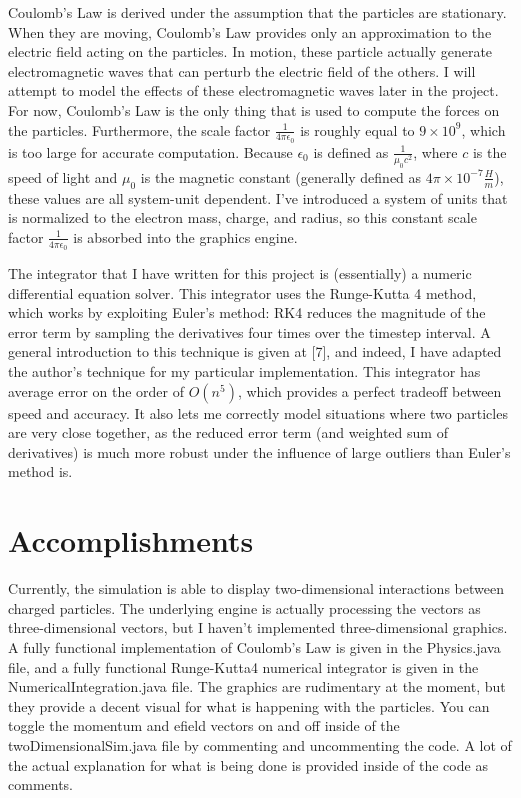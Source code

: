 \documentclass[10pt]{article}
\begin{document}
Coulomb's Law is derived under the assumption that the particles are stationary. When they are moving, Coulomb's Law provides only an approximation to the electric field acting on the particles. In motion, these particle actually generate electromagnetic waves that can perturb the electric field of the others. I will attempt to model the effects of these electromagnetic waves later in the project. For now, Coulomb's Law is the only thing that is used to compute the forces on the particles. Furthermore, the scale factor $\frac{1}{4\pi\epsilon_0}$ is roughly equal to $9 \times 10^9$, which is too large for accurate computation. Because $\epsilon_0$ is defined as $\frac{1}{\mu_0 c^2}$, where $c$ is the speed of light and $\mu_0$ is the magnetic constant (generally defined as $4\pi \times 10^{-7} \frac{H}{m}$), these values are all system-unit dependent. I've introduced a system of units that is normalized to the electron mass, charge, and radius, so this constant scale factor $\frac{1}{4\pi\epsilon_0}$ is absorbed into the graphics engine.

The integrator that I have written for this project is (essentially) a numeric differential equation solver. This integrator uses the Runge-Kutta 4 method, which works by exploiting Euler's method: RK4 reduces the magnitude of the error term by sampling the derivatives four times over the timestep interval. A general introduction to this technique is given at [7], and indeed, I have adapted the author's technique for my particular implementation. This integrator has average error on the order of $O(n^5)$, which provides a perfect tradeoff between speed and accuracy. It also lets me correctly model situations where two particles are very close together, as the reduced error term (and weighted sum of derivatives) is much more robust under the influence of large outliers than Euler's method is.

\clearpage
\section{Accomplishments}
Currently, the simulation is able to display two-dimensional interactions between charged particles. The underlying engine is actually processing the vectors as three-dimensional vectors, but I haven't implemented three-dimensional graphics. A fully functional implementation of Coulomb's Law is given in the Physics.java file, and a fully functional Runge-Kutta4 numerical integrator is given in the NumericalIntegration.java file. The graphics are rudimentary at the moment, but they provide a decent visual for what is happening with the particles. You can toggle the momentum and efield vectors on and off inside of the twoDimensionalSim.java file by commenting and uncommenting the code. A lot of the actual explanation for what is being done is provided inside of the code as comments. 
\end{document}
